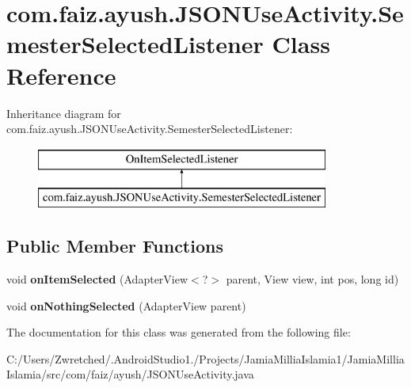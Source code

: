 \hypertarget{classcom_1_1faiz_1_1ayush_1_1_j_s_o_n_use_activity_1_1_semester_selected_listener}{}\section{com.\+faiz.\+ayush.\+J\+S\+O\+N\+Use\+Activity.\+Semester\+Selected\+Listener Class Reference}
\label{classcom_1_1faiz_1_1ayush_1_1_j_s_o_n_use_activity_1_1_semester_selected_listener}
Inheritance diagram for com.\+faiz.\+ayush.\+J\+S\+O\+N\+Use\+Activity.\+Semester\+Selected\+Listener\+:\begin{figure}[H]
\begin{center}
\leavevmode
\includegraphics[height=2.000000cm]{classcom_1_1faiz_1_1ayush_1_1_j_s_o_n_use_activity_1_1_semester_selected_listener}
\end{center}
\end{figure}
\subsection*{Public Member Functions}
\begin{DoxyCompactItemize}
\item 
\hypertarget{classcom_1_1faiz_1_1ayush_1_1_j_s_o_n_use_activity_1_1_semester_selected_listener_af9fc522b40eb723e0aa6280be9d9f312}{}void {\bfseries on\+Item\+Selected} (Adapter\+View$<$?$>$ parent, View view, int pos, long id)\label{classcom_1_1faiz_1_1ayush_1_1_j_s_o_n_use_activity_1_1_semester_selected_listener_af9fc522b40eb723e0aa6280be9d9f312}

\item 
\hypertarget{classcom_1_1faiz_1_1ayush_1_1_j_s_o_n_use_activity_1_1_semester_selected_listener_ac92e3fd1a9900fb50d68d83e05bd4b01}{}void {\bfseries on\+Nothing\+Selected} (Adapter\+View parent)\label{classcom_1_1faiz_1_1ayush_1_1_j_s_o_n_use_activity_1_1_semester_selected_listener_ac92e3fd1a9900fb50d68d83e05bd4b01}

\end{DoxyCompactItemize}


The documentation for this class was generated from the following file\+:\begin{DoxyCompactItemize}
\item 
C\+:/\+Users/\+Zwretched/.\+Android\+Studio1./\+Projects/\+Jamia\+Millia\+Islamia1/\+Jamia\+Millia\+Islamia/src/com/faiz/ayush/J\+S\+O\+N\+Use\+Activity.\+java\end{DoxyCompactItemize}
